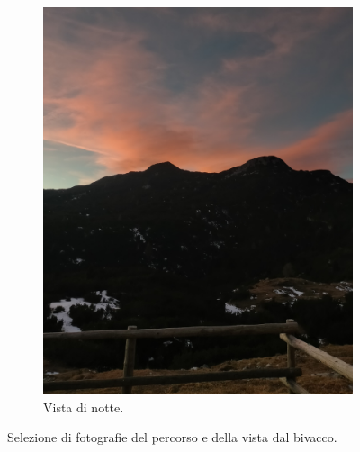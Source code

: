 \documentclass{article}
\begin{document}
\begin{figure}[H]
\begin{subfigure}[b]{0.45\textwidth}
        \includegraphics[width=\textwidth]{images/foto_notte.jpg}
        \caption{Vista di notte.}
    \end{subfigure}
    \hfill

    \caption{Selezione di fotografie del percorso e della vista dal bivacco.}
\end{figure}
\end{document}
